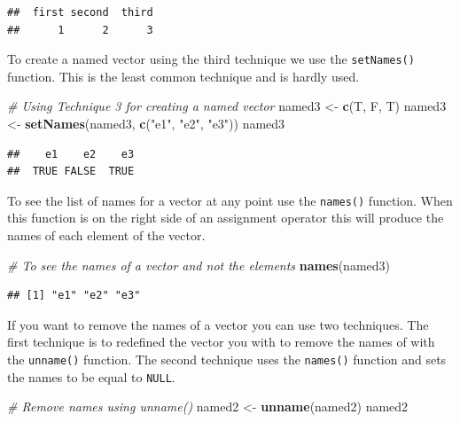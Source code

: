 \documentclass[
]{book}
\newenvironment{Shaded}{\begin{snugshade}}{\end{snugshade}}
\newcommand{\CommentTok}[1]{\textcolor[rgb]{0.56,0.35,0.01}{\textit{#1}}}
\newcommand{\KeywordTok}[1]{\textcolor[rgb]{0.13,0.29,0.53}{\textbf{#1}}}
\newcommand{\NormalTok}[1]{#1}
\newcommand{\StringTok}[1]{\textcolor[rgb]{0.31,0.60,0.02}{#1}}
\begin{document}
\begin{verbatim}
##  first second  third 
##      1      2      3
\end{verbatim}

To create a named vector using the third technique we use the \texttt{setNames()} function. This is the least common technique and is hardly used.

\begin{Shaded}
\begin{Highlighting}[]
\CommentTok{# Using Technique 3 for creating a named vector}
\NormalTok{named3 <-}\StringTok{ }\KeywordTok{c}\NormalTok{(T, F, T)}
\NormalTok{named3 <-}\StringTok{ }\KeywordTok{setNames}\NormalTok{(named3, }\KeywordTok{c}\NormalTok{(}\StringTok{"e1"}\NormalTok{, }\StringTok{"e2"}\NormalTok{, }\StringTok{"e3"}\NormalTok{))}
\NormalTok{named3}
\end{Highlighting}
\end{Shaded}

\begin{verbatim}
##    e1    e2    e3 
##  TRUE FALSE  TRUE
\end{verbatim}

To see the list of names for a vector at any point use the \texttt{names()} function. When this function is on the right side of an assignment operator this will produce the names of each element of the vector.

\begin{Shaded}
\begin{Highlighting}[]
\CommentTok{# To see the names of a vector and not the elements}
\KeywordTok{names}\NormalTok{(named3)}
\end{Highlighting}
\end{Shaded}

\begin{verbatim}
## [1] "e1" "e2" "e3"
\end{verbatim}

If you want to remove the names of a vector you can use two techniques. The first technique is to redefined the vector you with to remove the names of with the \texttt{unname()} function. The second technique uses the \texttt{names()} function and sets the names to be equal to \texttt{NULL}.

\begin{Shaded}
\begin{Highlighting}[]
\CommentTok{# Remove names using unname()}
\NormalTok{named2 <-}\StringTok{ }\KeywordTok{unname}\NormalTok{(named2)}
\NormalTok{named2}
\end{Highlighting}
\end{Shaded}
\end{document}
